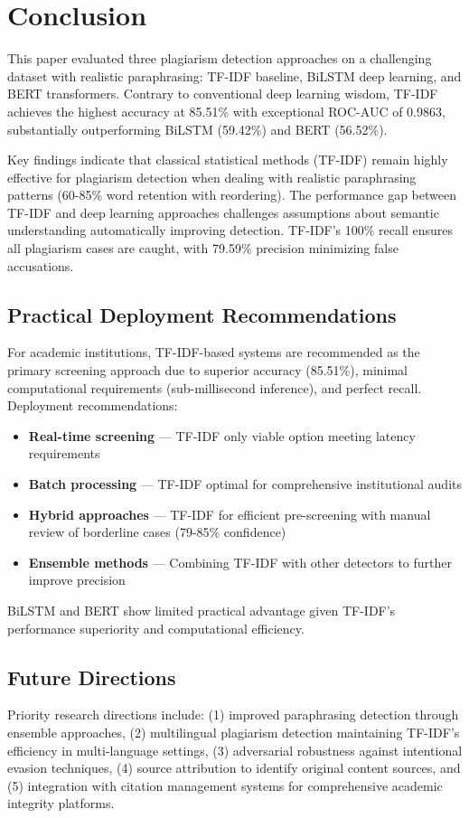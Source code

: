 \section{Conclusion} \label{sec:conclusion}

This paper evaluated three plagiarism detection approaches on a challenging dataset with realistic paraphrasing: TF-IDF baseline, BiLSTM deep learning, and BERT transformers. Contrary to conventional deep learning wisdom, TF-IDF achieves the highest accuracy at 85.51\% with exceptional ROC-AUC of 0.9863, substantially outperforming BiLSTM (59.42\%) and BERT (56.52\%).

Key findings indicate that classical statistical methods (TF-IDF) remain highly effective for plagiarism detection when dealing with realistic paraphrasing patterns (60-85\% word retention with reordering). The performance gap between TF-IDF and deep learning approaches challenges assumptions about semantic understanding automatically improving detection. TF-IDF's 100\% recall ensures all plagiarism cases are caught, with 79.59\% precision minimizing false accusations.

\subsection{Practical Deployment Recommendations}

For academic institutions, TF-IDF-based systems are recommended as the primary screening approach due to superior accuracy (85.51\%), minimal computational requirements (sub-millisecond inference), and perfect recall. Deployment recommendations:

\begin{itemize}
  \item \textbf{Real-time screening} --- TF-IDF only viable option meeting latency requirements
  \item \textbf{Batch processing} --- TF-IDF optimal for comprehensive institutional audits
  \item \textbf{Hybrid approaches} --- TF-IDF for efficient pre-screening with manual review of borderline cases (79-85\% confidence)
  \item \textbf{Ensemble methods} --- Combining TF-IDF with other detectors to further improve precision
\end{itemize}

BiLSTM and BERT show limited practical advantage given TF-IDF's performance superiority and computational efficiency.

\subsection{Future Directions}

Priority research directions include: (1) improved paraphrasing detection through ensemble approaches, (2) multilingual plagiarism detection maintaining TF-IDF's efficiency in multi-language settings, (3) adversarial robustness against intentional evasion techniques, (4) source attribution to identify original content sources, and (5) integration with citation management systems for comprehensive academic integrity platforms.
